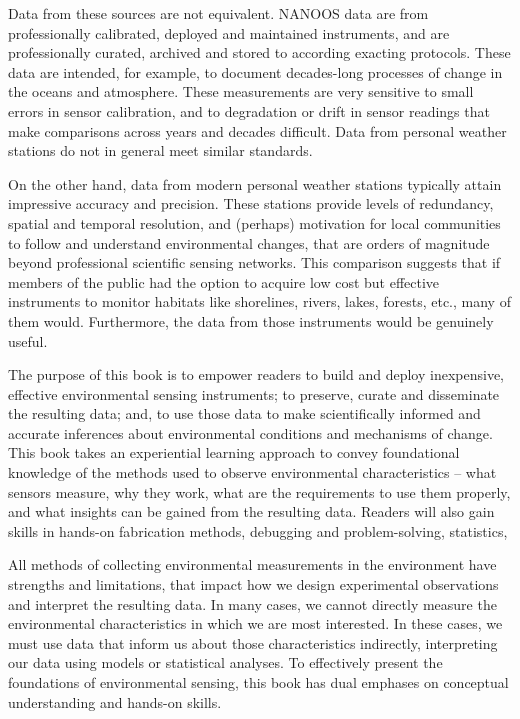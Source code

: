 Data from these sources are not equivalent.
NANOOS data are from professionally calibrated, deployed and maintained instruments, and are professionally curated, archived and stored to according exacting protocols. 
These data are intended, for example, to document decades-long processes of change in the oceans and atmosphere. 
These measurements are very sensitive to small errors in sensor calibration, and to degradation or drift in sensor readings that make comparisons across years and decades difficult.
Data from personal weather stations do not in general meet similar standards. 

On the other hand, data from modern personal weather stations typically attain impressive accuracy and precision.
These stations provide levels of redundancy, spatial and temporal resolution, and (perhaps) motivation for local communities to follow and understand environmental changes, that are orders of magnitude beyond professional scientific sensing networks. 
This comparison suggests that if members of the public had the option to acquire low cost but effective instruments to monitor habitats like shorelines, rivers, lakes, forests, etc., many of them would. 
Furthermore, the data from those instruments would be genuinely useful.

The purpose of this book is to empower readers to build and deploy inexpensive, effective environmental sensing instruments; to preserve, curate and disseminate the resulting data; and, to use those data to make scientifically informed and accurate inferences about environmental conditions and mechanisms of change. 
This book takes an experiential learning approach to convey foundational knowledge of the methods used to observe environmental characteristics -- what sensors measure, why they work, what are the requirements to use them properly, and what insights can be gained from the resulting data.
Readers will also gain skills in hands-on fabrication methods, debugging and problem-solving, statistics, 

All methods of collecting environmental measurements in the environment have strengths and limitations, that impact how we design experimental observations and interpret the resulting data. 
In many cases, we cannot directly measure the environmental characteristics in which we are most interested. 
In these cases, we must use data that inform us about those characteristics indirectly, interpreting our data using models or statistical analyses. 
To effectively present the foundations of environmental sensing, this book has dual emphases on conceptual understanding and 
hands-on skills.

